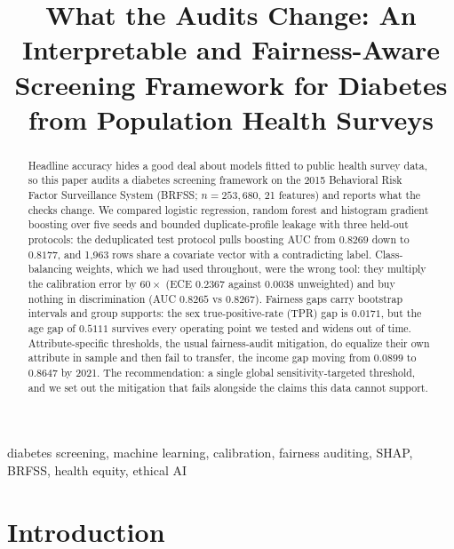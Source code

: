 \documentclass[conference]{IEEEtran}
\begin{document}
\title{What the Audits Change: An Interpretable and Fairness-Aware Screening Framework for Diabetes from Population Health Surveys}

\author{
\IEEEauthorblockA{\textit{[Department]} \\
\textit{[Institution]} \\
[City], [Country] \\
[email]}}

\maketitle

\begin{abstract}
Headline accuracy hides a good deal about models fitted to public health survey data, so this paper audits a diabetes screening framework on the 2015 Behavioral Risk Factor Surveillance System (BRFSS; $n = 253{,}680$, 21 features) and reports what the checks change. We compared logistic regression, random forest and histogram gradient boosting over five seeds and bounded duplicate-profile leakage with three held-out protocols: the deduplicated test protocol pulls boosting AUC from $0.8269$ down to $0.8177$, and 1{,}963 rows share a covariate vector with a contradicting label. Class-balancing weights, which we had used throughout, were the wrong tool: they multiply the calibration error by $60\times$ (ECE $0.2367$ against $0.0038$ unweighted) and buy nothing in discrimination (AUC $0.8265$ vs $0.8267$). Fairness gaps carry bootstrap intervals and group supports: the sex true-positive-rate (TPR) gap is $0.0171$, but the age gap of $0.5111$ survives every operating point we tested and widens out of time. Attribute-specific thresholds, the usual fairness-audit mitigation, do equalize their own attribute in sample and then fail to transfer, the income gap moving from $0.0899$ to $0.8647$ by 2021. The recommendation: a single global sensitivity-targeted threshold, and we set out the mitigation that fails alongside the claims this data cannot support.
\end{abstract}

\begin{IEEEkeywords}
diabetes screening, machine learning, calibration, fairness auditing, SHAP, BRFSS, health equity, ethical AI
\end{IEEEkeywords}

\section{Introduction}
\end{document}
